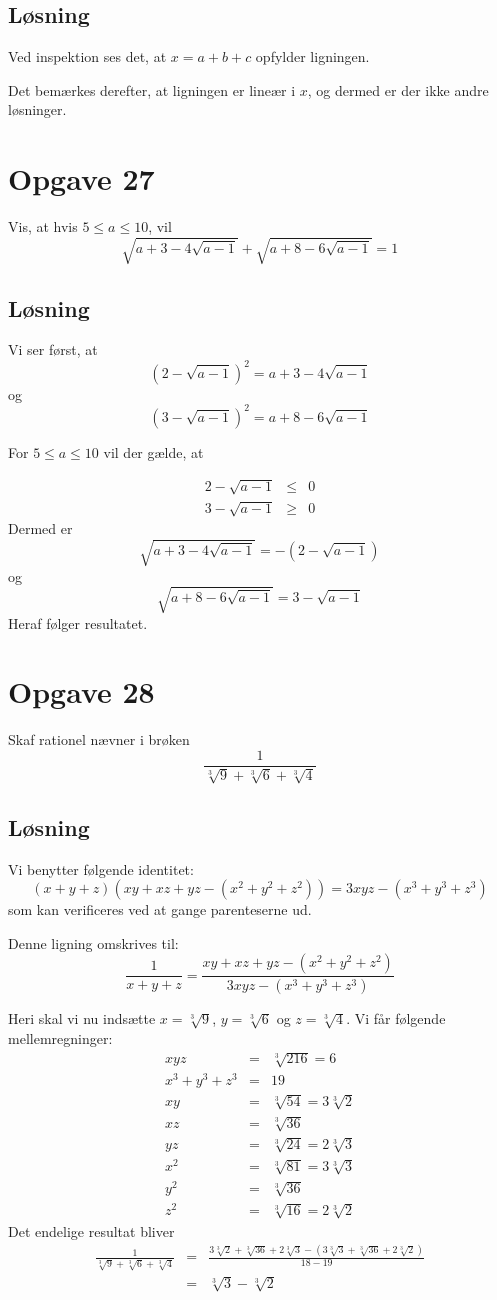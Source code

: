 \documentclass[12pt,oneside,a4paper]{article}
\newcommand{\bas}{\begin{eqnarray*}}
\newcommand{\eas}{\end{eqnarray*}}
\begin{document}
\subsection{Løsning}
Ved inspektion ses det, at $x=a+b+c$ opfylder ligningen.

Det bemærkes derefter, at ligningen er lineær i $x$, og dermed er der ikke andre løsninger.


\section{Opgave 27}
Vis, at hvis $5\le a\le 10$, vil
$$
\sqrt{a+3-4\sqrt{a-1}} + \sqrt{a+8-6\sqrt{a-1}} = 1
$$

\subsection{Løsning}
Vi ser først, at 
$$
\left(2-\sqrt{a-1}\right)^2 = a+3-4\sqrt{a-1}
$$
og
$$
\left(3-\sqrt{a-1}\right)^2 = a+8-6\sqrt{a-1}
$$

For $5\le a\le 10$ vil der gælde, at

\bas
2-\sqrt{a-1} &\le& 0 \\
3-\sqrt{a-1} &\ge& 0 
\eas
Dermed er
$$
\sqrt{a+3-4\sqrt{a-1}} = -(2-\sqrt{a-1}) 
$$
og 
$$
\sqrt{a+8-6\sqrt{a-1}} = 3-\sqrt{a-1} 
$$
Heraf følger resultatet.



\section{Opgave 28}
Skaf rationel nævner i brøken
$$
\frac{1}{\sqrt[3]9 + \sqrt[3]6 + \sqrt[3]4}
$$

\subsection{Løsning}
Vi benytter følgende identitet:
$$
(x+y+z) \left(xy+xz+yz - (x^2+y^2+z^2)\right) = 3xyz - (x^3+y^3+z^3)
$$
som kan verificeres ved at gange parenteserne ud.

Denne ligning omskrives til:
$$
\frac{1}{x+y+z} = \frac{xy+xz+yz - (x^2+y^2+z^2)}{3xyz - (x^3+y^3+z^3)}
$$

Heri skal vi nu indsætte $x=\sqrt[3]9$, $y=\sqrt[3]6$ og $z=\sqrt[3]4$. Vi får følgende mellemregninger:
\bas
xyz &=& \sqrt[3]{216} = 6\\
x^3+y^3+z^3 &=& 19 \\
xy &=& \sqrt[3]{54} = 3\sqrt[3]2 \\
xz &=& \sqrt[3]{36} \\
yz &=& \sqrt[3]{24} = 2\sqrt[3]3 \\
x^2 &=& \sqrt[3]{81} = 3\sqrt[3]3 \\
y^2 &=& \sqrt[3]{36} \\
z^2 &=& \sqrt[3]{16} = 2\sqrt[3]2
\eas
Det endelige resultat bliver
\bas
\frac{1}{\sqrt[3]9 + \sqrt[3]6 + \sqrt[3]4} 
&=& \frac{3\sqrt[3]2 + \sqrt[3]{36} + 2\sqrt[3]3 - (3\sqrt[3]3 + \sqrt[3]{36} + 2\sqrt[3]2)}{18-19} \\
&=& \sqrt[3]3 - \sqrt[3]2
\eas
\end{document}
